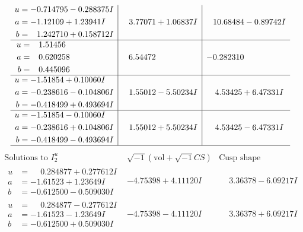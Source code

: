 \documentclass[1p]{elsarticle_modified}
\theoremstyle{definition}
\newcommand{\I}{\sqrt{-1}}
\begin{document}
$$\begin{array}{c|c|c}
\begin{aligned}
u &= -0.714795 - 0.288375 I \\
a &= -1.12109 + 1.23941 I \\
b &= \phantom{-}1.242710 + 0.158712 I\end{aligned}
 & \phantom{-}3.77071 + 1.06837 I & \phantom{-}10.68484 - 0.89742 I \\ \hline\begin{aligned}
u &= \phantom{-}1.51456\phantom{ +0.000000I} \\
a &= \phantom{-}0.620258\phantom{ +0.000000I} \\
b &= \phantom{-}0.445096\phantom{ +0.000000I}\end{aligned}
 & \phantom{-}6.54472\phantom{ +0.000000I} & -0.282310\phantom{ +0.000000I} \\ \hline\begin{aligned}
u &= -1.51854 + 0.10060 I \\
a &= -0.238616 - 0.104806 I \\
b &= -0.418499 + 0.493694 I\end{aligned}
 & \phantom{-}1.55012 - 5.50234 I & \phantom{-}4.53425 + 6.47331 I \\ \hline\begin{aligned}
u &= -1.51854 - 0.10060 I \\
a &= -0.238616 + 0.104806 I \\
b &= -0.418499 - 0.493694 I\end{aligned}
 & \phantom{-}1.55012 + 5.50234 I & \phantom{-}4.53425 - 6.47331 I\\
 \hline 
 \end{array}$$\newpage$$\begin{array}{c|c|c}  
\text{Solutions to }I^u_{2}& \I (\text{vol} + \sqrt{-1}CS) & \text{Cusp shape}\\
 \hline 
\begin{aligned}
u &= \phantom{-}0.284877 + 0.277612 I \\
a &= -1.61523 + 1.23649 I \\
b &= -0.612500 - 0.509030 I\end{aligned}
 & -4.75398 + 4.11120 I & \phantom{-}3.36378 - 6.09217 I \\ \hline\begin{aligned}
u &= \phantom{-}0.284877 - 0.277612 I \\
a &= -1.61523 - 1.23649 I \\
b &= -0.612500 + 0.509030 I\end{aligned}
 & -4.75398 - 4.11120 I & \phantom{-}3.36378 + 6.09217 I \\ \hline\begin{aligned}

\end{aligned}
\end{array}$$
\end{document}

